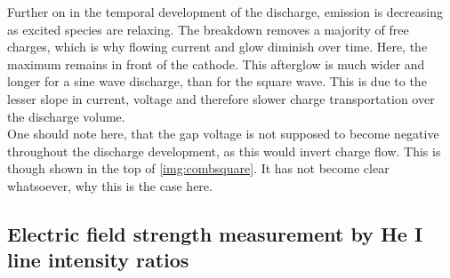 \documentclass[a4paper,10pt,twoside]{article}
\begin{document}
		Further on in the temporal development of the discharge, emission is decreasing as excited species are relaxing. The breakdown removes a majority of free charges, which is why flowing current and glow diminish over time. Here, the maximum remains in front of the cathode. This afterglow is much wider and longer for a sine wave discharge, than for the square wave. This is due to the lesser slope in current, voltage and therefore slower charge transportation over the discharge volume.\\
		One should note here, that the gap voltage is not supposed to become negative throughout the discharge development, as this would invert charge flow. This is though shown in the top of \autoref{img:combsquare}. It has not become clear whatsoever, why this is the case here. 
		
	\subsection{Electric field strength measurement by He I line intensity ratios}
		
\end{document}

